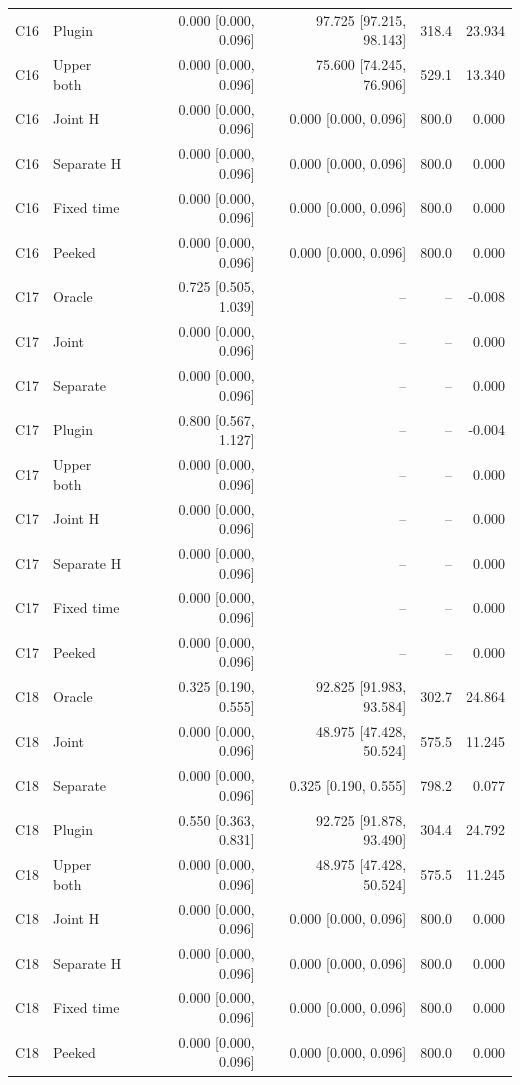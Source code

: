 \begin{longtable}{llrrrr}
C16 & Plugin & 0.000 [0.000, 0.096] & 97.725 [97.215, 98.143] & 318.4 & 23.934\\
C16 & Upper both & 0.000 [0.000, 0.096] & 75.600 [74.245, 76.906] & 529.1 & 13.340\\
C16 & Joint H & 0.000 [0.000, 0.096] & 0.000 [0.000, 0.096] & 800.0 & 0.000\\
C16 & Separate H & 0.000 [0.000, 0.096] & 0.000 [0.000, 0.096] & 800.0 & 0.000\\
C16 & Fixed time & 0.000 [0.000, 0.096] & 0.000 [0.000, 0.096] & 800.0 & 0.000\\
C16 & Peeked & 0.000 [0.000, 0.096] & 0.000 [0.000, 0.096] & 800.0 & 0.000\\
C17 & Oracle & 0.725 [0.505, 1.039] & -- & -- & -0.008\\
C17 & Joint & 0.000 [0.000, 0.096] & -- & -- & 0.000\\
C17 & Separate & 0.000 [0.000, 0.096] & -- & -- & 0.000\\
C17 & Plugin & 0.800 [0.567, 1.127] & -- & -- & -0.004\\
C17 & Upper both & 0.000 [0.000, 0.096] & -- & -- & 0.000\\
C17 & Joint H & 0.000 [0.000, 0.096] & -- & -- & 0.000\\
C17 & Separate H & 0.000 [0.000, 0.096] & -- & -- & 0.000\\
C17 & Fixed time & 0.000 [0.000, 0.096] & -- & -- & 0.000\\
C17 & Peeked & 0.000 [0.000, 0.096] & -- & -- & 0.000\\
C18 & Oracle & 0.325 [0.190, 0.555] & 92.825 [91.983, 93.584] & 302.7 & 24.864\\
C18 & Joint & 0.000 [0.000, 0.096] & 48.975 [47.428, 50.524] & 575.5 & 11.245\\
C18 & Separate & 0.000 [0.000, 0.096] & 0.325 [0.190, 0.555] & 798.2 & 0.077\\
C18 & Plugin & 0.550 [0.363, 0.831] & 92.725 [91.878, 93.490] & 304.4 & 24.792\\
C18 & Upper both & 0.000 [0.000, 0.096] & 48.975 [47.428, 50.524] & 575.5 & 11.245\\
C18 & Joint H & 0.000 [0.000, 0.096] & 0.000 [0.000, 0.096] & 800.0 & 0.000\\
C18 & Separate H & 0.000 [0.000, 0.096] & 0.000 [0.000, 0.096] & 800.0 & 0.000\\
C18 & Fixed time & 0.000 [0.000, 0.096] & 0.000 [0.000, 0.096] & 800.0 & 0.000\\
C18 & Peeked & 0.000 [0.000, 0.096] & 0.000 [0.000, 0.096] & 800.0 & 0.000\\

\end{longtable}
